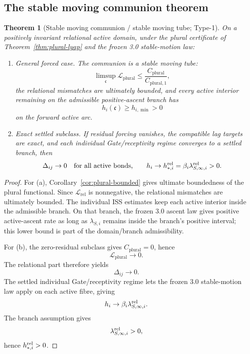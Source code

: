 \documentclass[11pt,a4paper]{article}
\theoremstyle{definition}
\theoremstyle{plain}
\newtheorem{theorem}[definition]{Theorem}
\theoremstyle{remark}
\begin{document}
\subsection{The stable moving communion theorem}

\begin{theorem}[Stable moving communion / stable moving tube; Type-1]\label{thm:moving}
On a positively invariant relational active domain, under the plural certificate
of Theorem~\ref{thm:plural-lyap} and the frozen 3.0 stable-motion law:

\begin{enumerate}[label=\textup{(\alph*)},leftmargin=1.2cm]
\item \emph{General forced case.}
The communion is a stable moving tube:
\[
\limsup_{\mathfrak c}\mathcal L_{\mathrm{plural}}
\le
\frac{C_{\mathrm{plural}}}{C_{\mathrm{plural},1}},
\]
the relational mismatches are ultimately bounded, and every active interior
remaining on the admissible positive-ascent branch has
\[
h_i(\mathfrak c)\ge h_{i,\min}>0
\]
on the forward active arc.

\item \emph{Exact settled subclass.}
If residual forcing vanishes, the compatible lag targets are exact, and each
individual Gate/receptivity regime converges to a settled branch, then
\[
\Delta_{ij}\to0
\quad\text{for all active bonds,}
\qquad
h_i\to h_{*,i}^{\rm rel}
=
\beta_i\lambda_{S,\infty,i}^{\rm rel}>0.
\]
\end{enumerate}
\end{theorem}

\begin{proof}
For (a), Corollary~\ref{cor:plural-bounded} gives ultimate boundedness of the
plural functional. Since \(\mathcal L_{\mathrm{rel}}\) is nonnegative, the
relational mismatches are ultimately bounded. The individual ISS estimates keep
each active interior inside the admissible branch. On that branch, the frozen 3.0
ascent law gives positive active-ascent rate as long as
\(\lambda_{S,i}\) remains inside the branch's positive interval; this lower bound
is part of the domain/branch admissibility.

For (b), the zero-residual subclass gives \(C_{\mathrm{plural}}=0\), hence
\[
\mathcal L_{\mathrm{plural}}\to0.
\]
The relational part therefore yields
\[
\Delta_{ij}\to0.
\]
The settled individual Gate/receptivity regime lets the frozen 3.0 stable-motion
law apply on each active fibre, giving
\[
h_i\to\beta_i\lambda_{S,\infty,i}^{\rm rel}.
\]
The branch assumption gives
\[
\lambda_{S,\infty,i}^{\rm rel}>0,
\]
hence \(h_{*,i}^{\rm rel}>0\). \qedhere
\end{proof}
\end{document}
